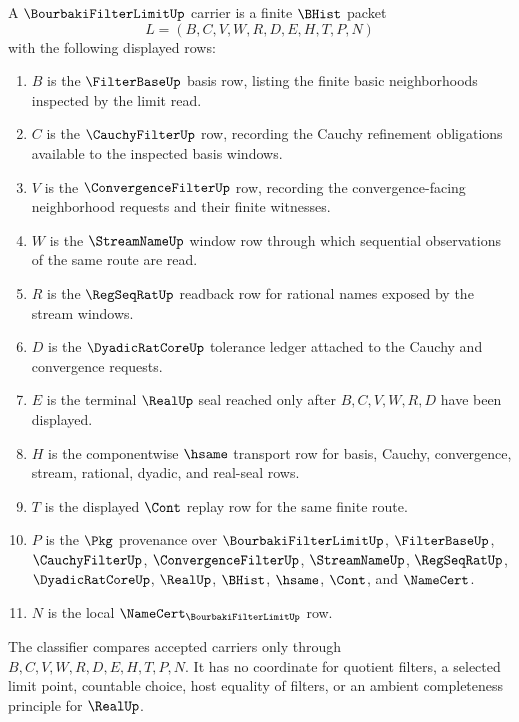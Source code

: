 \begin{definition}
\label{def:bourbaki-filter-limit-carrier}
A $\BourbakiFilterLimitUp$ carrier is a finite $\BHist$ packet
$$
L=(B,C,V,W,R,D,E,H,T,P,N)
$$
with the following displayed rows:
\begin{enumerate}
\item $B$ is the $\FilterBaseUp$ basis row, listing the finite basic neighborhoods inspected by the limit read.
\item $C$ is the $\CauchyFilterUp$ row, recording the Cauchy refinement obligations available to the inspected basis windows.
\item $V$ is the $\ConvergenceFilterUp$ row, recording the convergence-facing neighborhood requests and their finite witnesses.
\item $W$ is the $\StreamNameUp$ window row through which sequential observations of the same route are read.
\item $R$ is the $\RegSeqRatUp$ readback row for rational names exposed by the stream windows.
\item $D$ is the $\DyadicRatCoreUp$ tolerance ledger attached to the Cauchy and convergence requests.
\item $E$ is the terminal $\RealUp$ seal reached only after $B,C,V,W,R,D$ have been displayed.
\item $H$ is the componentwise $\hsame$ transport row for basis, Cauchy, convergence, stream, rational, dyadic, and real-seal rows.
\item $T$ is the displayed $\Cont$ replay row for the same finite route.
\item $P$ is the $\Pkg$ provenance over $\BourbakiFilterLimitUp$, $\FilterBaseUp$, $\CauchyFilterUp$, $\ConvergenceFilterUp$, $\StreamNameUp$, $\RegSeqRatUp$, $\DyadicRatCoreUp$, $\RealUp$, $\BHist$, $\hsame$, $\Cont$, and $\NameCert$.
\item $N$ is the local $\NameCert_{\BourbakiFilterLimitUp}$ row.
\end{enumerate}
The classifier compares accepted carriers only through $B,C,V,W,R,D,E,H,T,P,N$. It has no coordinate for quotient filters, a selected limit point, countable choice, host equality of filters, or an ambient completeness principle for $\RealUp$.
\end{definition}

